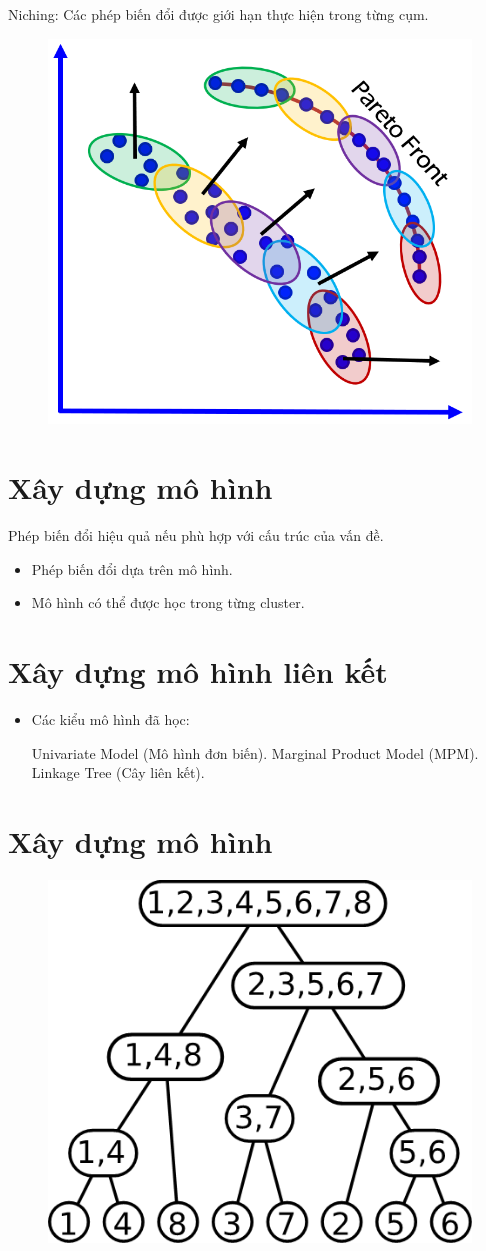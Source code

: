 \documentclass{book}
\begin{document}
Niching: Các phép biến đổi được giới hạn thực hiện trong từng cụm.
\begin{figure}[H]
    \centering
    \includegraphics[width=0.5\linewidth]{images/GA-7-8_67.png}
\end{figure}

\section*{Xây dựng mô hình}

Phép biến đổi hiệu quả nếu phù hợp với cấu trúc của vấn đề.
\begin{itemize}
     \item Phép biến đổi dựa trên mô hình.
     \item Mô hình có thể được học trong từng cluster.
\end{itemize}

\section*{Xây dựng mô hình liên kết}

\begin{itemize}
    \item Các kiểu mô hình đã học:
    \begin{itemize}
         Univariate Model (Mô hình đơn biến).
         Marginal Product Model (MPM).
         Linkage Tree (Cây liên kết).
    \end{itemize}
\end{itemize}

\section*{Xây dựng mô hình}

\begin{figure}[H]
    \centering
    \includegraphics[width=0.5\linewidth]{images/GA-7-8_71.png}
\end{figure}
\end{document}

